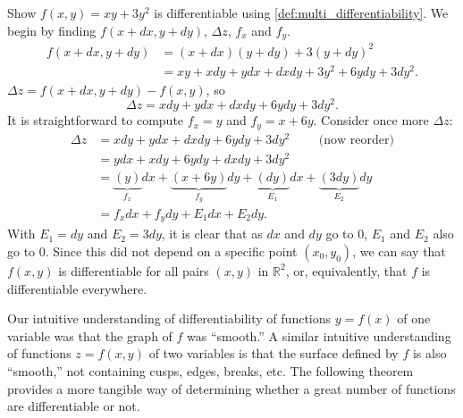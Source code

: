 \begin{example}\label{ex_totaldiff1}
Show $f(x,y) = xy+3y^2$ is differentiable using \autoref{def:multi_differentiability}.
\solution
We begin by finding $f(x+dx,y+dy)$, $\Delta z$, $f_x$ and $f_y$.
\begin{align*}
f(x+dx,y+dy) &= (x+dx)(y+dy) + 3(y+dy)^2 \\
						&= xy + xdy+ydx+dx dy + 3y^2+6ydy+3dy^2.
\end{align*}
$\Delta z = f(x+dx,y+dy) - f(x,y)$, so
\[\Delta z = xdy + ydx + dx dy + 6ydy+3dy^2.\]
It is straightforward to compute $f_x = y$ and $f_y = x+6y$. Consider once more $\Delta z$:
\begin{align*}
\Delta z &= xdy + ydx + dx dy + 6ydy+3dy^2 \qquad \text{ (now reorder)}\\
		&= ydx + xdy+6ydy+ dx dy + 3dy^2\\
		&= \underbrace{(y)}_{f_x}dx + \underbrace{(x+6y)}_{f_y}dy + \underbrace{(dy)}_{E_1}dx+\underbrace{(3dy)}_{E_2}dy\\
		&= f_xdx + f_ydy + E_1dx+E_2dy.
\end{align*}
With $E_1 = dy$ and $E_2 = 3dy$, it is clear that as $dx$ and $dy$ go to 0, $E_1$ and $E_2$ also go to 0. Since this did not depend on a specific point $(x_0,y_0)$, we can say that $f(x,y)$ is differentiable for all pairs $(x,y)$ in $\mathbb{R}^2$, or, equivalently, that $f$ is differentiable everywhere.
\end{example}

Our intuitive understanding of differentiability of functions $y=f(x)$ of one variable was that the graph of $f$ was ``smooth.'' A similar intuitive understanding of functions $z=f(x,y)$ of two variables is that the surface defined by $f$ is also ``smooth,'' not containing cusps, edges, breaks,  etc. The following theorem
provides a more tangible way of determining whether a great number of functions are differentiable or not.


